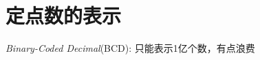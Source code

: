 \documentclass{template}
\begin{document}
\ttfamily
\section{定点数的表示}
\textit{Binary-Coded Decimal}(BCD): 只能表示1亿个数，有点浪费
\end{document}
